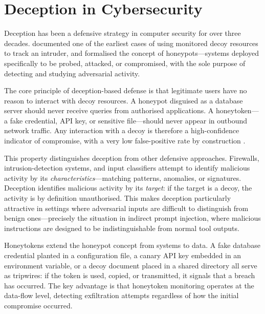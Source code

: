\section{Deception in Cybersecurity}
\label{sec:deception_cyber}

\begin{justify}
Deception has been a defensive strategy in computer security for over three decades.  \cite{stoll1989cuckoo} documented one of the earliest cases of using monitored decoy resources to track an intruder, and \cite{spitzner2003honeypots} formalised the concept of honeypots---systems deployed specifically to be probed, attacked, or compromised, with the sole purpose of detecting and studying adversarial activity.
\end{justify}

\begin{justify}
The core principle of deception-based defense is that legitimate users have no reason to interact with decoy resources.  A honeypot disguised as a database server should never receive queries from authorised applications.  A honeytoken---a fake credential, API key, or sensitive file---should never appear in outbound network traffic.  Any interaction with a decoy is therefore a high-confidence indicator of compromise, with a very low false-positive rate by construction \citep{spitzner2003honeypots}.
\end{justify}

\begin{justify}
This property distinguishes deception from other defensive approaches.  Firewalls, intrusion-detection systems, and input classifiers attempt to identify malicious activity by its \emph{characteristics}---matching patterns, anomalies, or signatures.  Deception identifies malicious activity by its \emph{target}: if the target is a decoy, the activity is by definition unauthorised.  This makes deception particularly attractive in settings where adversarial inputs are difficult to distinguish from benign ones---precisely the situation in indirect prompt injection, where malicious instructions are designed to be indistinguishable from normal tool outputs.
\end{justify}

\begin{justify}
Honeytokens extend the honeypot concept from systems to data.  A fake database credential planted in a configuration file, a canary API key embedded in an environment variable, or a decoy document placed in a shared directory all serve as tripwires: if the token is used, copied, or transmitted, it signals that a breach has occurred.  The key advantage is that honeytoken monitoring operates at the data-flow level, detecting exfiltration attempts regardless of how the initial compromise occurred.
\end{justify}

